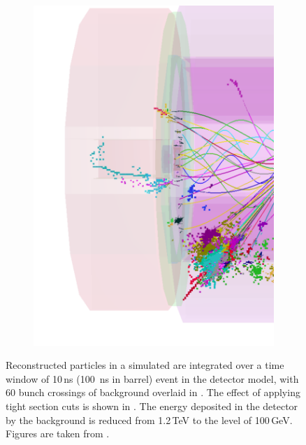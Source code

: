 \begin{figure}[tbph]
\begin{subfigure}[b]{0.45\textwidth}
    \includegraphics[width=\textwidth]{pandora/evtDisplayggHad2}
    \caption{}
    \label{fig:pandoraEvtDisplayggHad2}
  \end{subfigure}
\caption[Effect of the suppression of the background with the tight \PFO selection.]
{ Reconstructed particles  in a simulated \HepProcess{\Pep\Pem \to \PHiggs\PHiggs \to \Ptop\APbottom\Pbottom\APtop}  are integrated over a time window of 10\,ns (100 \,ns in \HCAL barrel) event in the \CLICILD detector model, with 60 bunch crossings of \ggHad background overlaid in . The effect of applying tight \PFO section cuts is shown in . The energy deposited in the detector by the background is reduced from 1.2\,TeV to the level of 100\,GeV. Figures are taken from \cite{Marshall:2012ry}.}
\label{fig:pandoraEvtDisplayggHad}
\end{figure}

